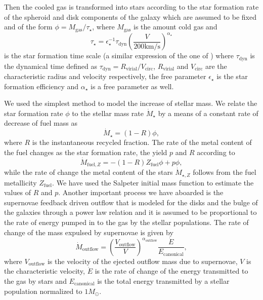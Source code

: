 \documentclass[usenatbib]{mn2e}
\begin{document}
Then the cooled gas is transformed into stars according to the star formation rate of the spheroid and disk components of the galaxy which are assumed to be fixed and of the form 
$\phi=M_{\text{gas}}/\tau_{\star}$, where $M_{\text{gas}}$ is the amount cold gas and 
\begin{equation}
 \tau_{\star} = \epsilon^{-1}_{\star}\tau_{\text{dyn}}\left( \frac{V}{200\text{km/s}}\right)^{\alpha_\star}
\end{equation}
is the star formation time scale (a similar expression of the one of \cite{2005MNRAS.356.1191B}) where $\tau_{\text{dyn}}$ is the dynamical time defined as
 $\tau_{\text{dyn}}=R_{\text{virial}}/V_{\text{circ}}$,  $R_{\text{virial}}$ and $V_{\text{circ}}$ are the characteristic radius and velocity respectively, 
the free parameter $\epsilon_{\star}$ is the star formation efficiency  and  $\alpha_\star$ is a free parameter as well.

We used the simplest method to model the increase of stellar mass. We relate the star formation rate $\phi$  to the stellar mass 
rate $\dot{M}_{\star}$ by a means of a constant rate of decrease of fuel mass as
\begin{equation}
 \dot{M}_{\star}=(1-R)\phi,
\end{equation}
where $R$ is the instantaneous recycled fraction. The rate of the metal content of the fuel changes as the star formation rate, the yield $p$ and $R$  according to
\begin{equation}  
 \dot{M}_{\text{fuel},Z}=-(1-R)Z_{\text{fuel}}\phi+p\phi,
\end{equation}
while the rate of change the metal content of the stars $\dot{M}_{\star, Z}$ follows from the fuel metallicity $Z_{\text{fuel}}$. We have used the Salpeter initial
 mass function \citep{1955ApJ...121..161S} to estimate the values of $R$ and $p$. Another important process we have aboarded is the supernovae feedback driven outflow that is 
modeled for the disks and the bulge of the galaxies through a power law relation and it is assumed to be  proportional to the rate of energy pumped in to the
 gas by the stellar populations. The rate of change of the mass expulsed by supernovae is given by
\begin{equation}
 \dot{M}_{\text{outflow}}=\left( \frac{V_{\text{outflow}}}{V} \right)^{\alpha_{\text{outflow}}}\frac{\dot{E}}{E_{\text{canonical}}}, \label{eq:supernovae}
\end{equation}
where  $V_{\text{outflow}}$ is the velocity of the ejected outflow mass due to supernovae, $V$ is the characteristic velocity,  $\dot{E}$ is the rate of change of 
the energy transmitted to the gas by stars and $E_{\text{canonical}}$ is the total energy transmitted by a stellar population normalized to $1M_{\odot}$.
\end{document}
